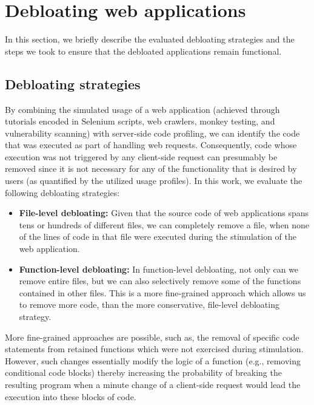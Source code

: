 \section{Debloating web applications}
\label{sec:debloating}

In this section, we briefly describe the evaluated debloating strategies and
the steps we took to ensure that the debloated applications remain functional.


\subsection{Debloating strategies}

By combining the simulated usage of a web application (achieved through
tutorials encoded in Selenium scripts, web crawlers, monkey testing, and
vulnerability scanning) with
server-side code profiling, we can identify the code that was executed
as part of handling web requests. Consequently, code whose execution was
not triggered by any client-side request can presumably be removed since
it is not necessary for any of the functionality that is desired by users
(as quantified by the utilized usage profiles).
In this work, we evaluate the following debloating strategies:

\begin{itemize}
    \item \textbf{File-level debloating:} Given that the source code of web applications spans tens or hundreds of different files, we can completely remove a file, when none of the lines of code in that file were executed during the stimulation of the web application.
    \item \textbf{Function-level debloating:} In function-level debloating, not only can we remove entire files, but we can also selectively remove some of the functions contained in other files. This is a more fine-grained approach which allows us to remove more code, than the more conservative, file-level debloating strategy.
\end{itemize}

More fine-grained approaches are possible, such as, the removal of specific code statements from retained functions which were not exercised during stimulation.
However, such changes essentially modify the logic of a function (e.g., removing
conditional code blocks) thereby increasing the probability of breaking the
resulting program when a minute change of a client-side request would lead the
execution into these blocks of code.

